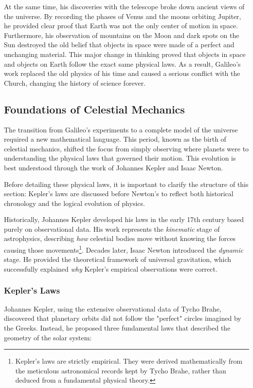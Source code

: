 \documentclass[10pt,a4paper]{article}
\begin{document}
At the same time, his discoveries with the telescope broke down ancient views of the universe. By recording the phases of Venus and the moons orbiting Jupiter, he provided clear proof that Earth was not the only center of motion in space. Furthermore, his observation of mountains on the Moon and dark spots on the Sun destroyed the old belief that objects in space were made of a perfect and unchanging material. This major change in thinking proved that objects in space and objects on Earth follow the exact same physical laws. As a result, Galileo's work replaced the old physics of his time and caused a serious conflict with the Church, changing the history of science forever.

\subsection{Foundations of Celestial Mechanics}
The transition from Galileo's experiments to a complete model of the universe required a new mathematical language. This period, known as the birth of celestial mechanics, shifted the focus from simply observing where planets were to understanding the physical laws that governed their motion. This evolution is best understood through the work of Johannes Kepler and Isaac Newton.

Before detailing these physical laws, it is important to clarify the structure of this section: Kepler's laws are discussed before Newton's to reflect both historical chronology and the logical evolution of physics.

Historically, Johannes Kepler developed his laws in the early 17th century based purely on observational data. His work represents the \textit{kinematic} stage of astrophysics, describing \textit{how} celestial bodies move without knowing the forces causing those movements\footnote{Kepler's laws are strictly empirical. They were derived mathematically from the meticulous astronomical records kept by Tycho Brahe, rather than deduced from a fundamental physical theory.}. Decades later, Isaac Newton introduced the \textit{dynamic} stage. He provided the theoretical framework of universal gravitation, which successfully explained \textit{why} Kepler's empirical observations were correct.

\subsubsection{Kepler's Laws}
Johannes Kepler, using the extensive observational data of Tycho Brahe, discovered that planetary orbits did not follow the "perfect" circles imagined by the Greeks. Instead, he proposed three fundamental laws that described the geometry of the solar system:
\end{document}
